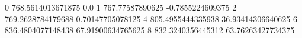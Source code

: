 0 768.5614013671875 0.0
1 767.77587890625 -0.7855224609375
2 769.2628784179688 0.70147705078125
4 805.4955444335938 36.93414306640625
6 836.4804077148438 67.91900634765625
8 832.3240356445312 63.76263427734375

